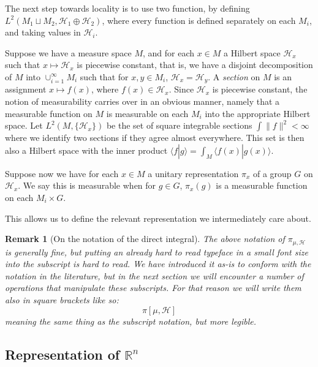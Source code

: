 \documentclass[
  12pt
]{article}
\theoremstyle{break}
\theoremstyle{plain}
\newtheorem*{rk}{Remark}
\newcommand{\bbr}{\ensuremath{\mathbb{R}}\xspace}
\newcommand{\hilb}{\ensuremath{\mathscr{H}}\xspace}
\begin{document}

  The next step towards locality is to use two function, by defining
  $L^2(M_1 \sqcup M_2, \mathscr{H}_1 \oplus \mathscr{H}_2)$, where every
  function is defined separately on each $M_i$, and taking values in
  $\mathscr{H}_i$.


  Suppose we have a measure space $M$, and for each $x \in M$ a
  Hilbert space $\mathscr{H}_x$ such that $x \mapsto \mathscr{H}_x$ is
  piecewise constant, that is, we have a disjoint decomposition of $M$
  into $\cup_{i=1}^{\infty} M_i$ such that for $x,y \in M_i$,
  $\mathscr{H}_x = \mathscr{H}_y$. 
  A \emph{section} on $M$ is an assignment $x \mapsto f(x)$, where
  $f(x) \in \mathscr{H}_x$. Since $\mathscr{H}_x$ is piecewise
  constant, the notion of measurability carries over in an obvious manner,
  namely that a measurable function on $M$ is measurable on each $M_i$
  into the appropriate Hilbert space. Let $L^2(M, \{\mathscr{H}_x\})$ be
  the set of square integrable sections $\int \| f \|^2 < \infty$ where
  we identify two sections if they agree almost everywhere. This set is
  then also a Hilbert space with the inner product
  $\langle f | g \rangle = \int_M \langle f(x) | g(x) \rangle$.

  Suppose now we have for each $x \in M$ a unitary representation
  $\pi_x$ of a group $G$ on $\mathscr{H}_x$. We say this is
  measurable when for $g \in G$, $\pi_x(g)$ is a measurable function
  on each $M_i \times G$.

  This allows us to define the relevant representation we intermediately
  care about.

  \begin{rk}[On the notation of the direct integral]
    \label{rem:integral-notation}
    The above notation of $\pi_{\mu, \hilb}$ is generally fine, but putting an
    already hard to read typeface in a small font size into the subscript is
    hard to read. We have introduced it as-is to conform with the notation in
    the literature, but in the next section we will encounter a number of
    operations that manipulate these subscripts. For that reason we will write
    them also in square brackets like so:
    $$
    \pi[\mu, \hilb]
    $$
    meaning the same thing as the subscript notation, but more legible.
  \end{rk}



  \hypertarget{representation-of-rn}{%
  \subsection{Representation of \texorpdfstring{$\bbr^n$}{R\^{}n}}\label{representation-of-rn}}
\end{document}
